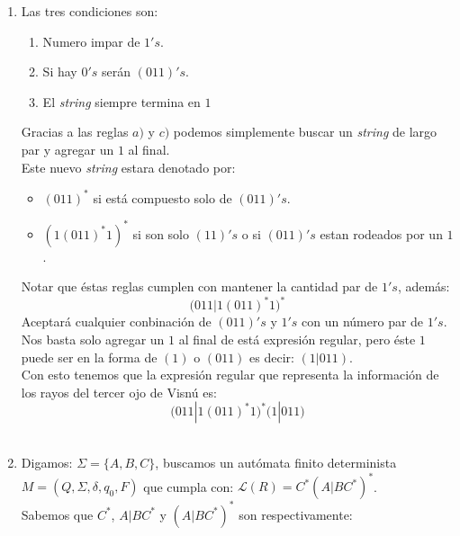 \documentclass[spanish, fleqn]{article}
\begin{document}
\begin{enumerate}
		\item
			Las tres condiciones son:
			\begin{enumerate}
				\item Numero impar de \(1's\).
				\item Si hay \(0's\) serán \((011)'s\).
				\item El \emph{string} siempre termina en \(1\)
			\end{enumerate}
			Gracias a las reglas \(a)\) y \(c)\) podemos simplemente buscar un
			\emph{string} de largo par y agregar un \(1\) al final.\\
			Este nuevo \emph{string} estara denotado por:
			\begin{itemize}
				\item \((011)^*\) si está compuesto solo de \((011)'s\).
				\item \(( 1 (011)^* 1 )^*\) si son solo \((11)'s\) o si 
					\((011)'s\) estan rodeados por un \(1\).
			\end{itemize}
			Notar que éstas reglas cumplen con mantener la cantidad par de 
			\(1's\), además:
			\begin{equation*}
				\bigl( 011 | 1 \left( 011 \right)^* 1 \bigr)^*
			\end{equation*}
			Aceptará cualquier conbinación de \((011)'s\) y \(1's\) con un 
			número par de \(1's\). Nos basta solo agregar un \(1\) al final de
			está expresión regular, pero éste \(1\) puede ser en la forma de
			\((1)\) o \((011)\) es decir: \( (1|011) \).\\
			Con esto tenemos que la expresión regular que representa la 
			información de los rayos del tercer ojo de Visnú es:
			\begin{equation*}
				\bigl( 011 | 1 \left( 011 \right)^* 1 \bigr)^*
				\bigl( 1 | 011 \bigr)
			\end{equation*}
			\\


		\item
			Digamos: \( \Sigma = \{A,B,C\} \), buscamos un autómata finito 
			determinista \(M = ( Q, \Sigma, \delta, q_{0}, F) \) que cumpla 
			con: \(\mathcal{L}(R) = C^{*}(A|BC^{*})^{*}\).\\
			Sabemos que \(C^*\), \(A|BC^*\) y \( (A|BC^* )^* \) son 
			respectivamente:
			

\end{enumerate}
\end{document}
